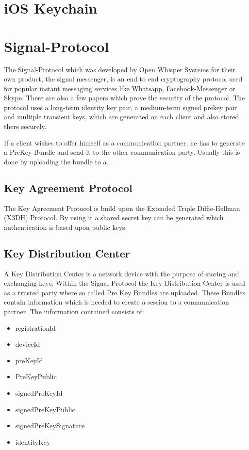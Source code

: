 \documentclass[12pt,oneside,a4paper,parskip]{scrbook}
\begin{document}
\section{iOS Keychain}


\section{Signal-Protocol}

The Signal-Protocol which was developed by Open Whisper Systems for their own product, the signal messenger, is an end to end cryptography protocol used for
popular instant messaging services like Whatsapp, Facebook-Messenger or Skype. There are also a few papers which prove the security of the protocol. \parencite{cohn-gordon_formal_2017}
\newline
The protocol uses a long-term identity key pair, a medium-term signed prekey pair and multiple transient keys, which are generated on each client and also stored there
securely.

If a client wishes to offer himself as a communication partner, he has to generate a PreKey Bundle and send it to the other communication party.
Usually this is done by uploading the bundle to a . 

\subsection{Key Agreement Protocol}

The Key Agreement Protocol is build upon the Extended Triple Diffie-Hellman (X3DH) Protocol. By using it a shared secret key can be generated which authentication
is based upon public keys. 


\subsection*{Key Distribution Center}
\label{subsec:KDC}

A Key Distribution Center is a network device with the purpose of storing and exchanging keys. Within the Signal Protocol the Key Distribution Center is used
as a trusted party where so called Pre Key Bundles are uploaded. These Bundles contain information which is needed to create a session to a communication partner.
The information contained consists of:
\begin{itemize}
  \item registrationId
  \item deviceId
  \item preKeyId
  \item PreKeyPublic
  \item signedPreKeyId
  \item signedPreKeyPublic
  \item signedPreKeySignature
  \item identityKey
\end{itemize}
\end{document}
